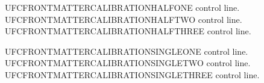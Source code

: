 \documentclass{abntexto-ufc}
\begin{document}
\pretextual

\clearpage
\thispagestyle{empty}
\noindent\hspace*{8cm}%
\begin{minipage}{\dimexpr\textwidth-8cm\relax}
  \onehalfsp
  \justifying
  \setlength{\parindent}{0pt}
  
\end{minipage}\par
\vfill
\clearpage


\clearpage
\thispagestyle{empty}

\begingroup
\onehalfsp
UFCFRONTMATTERCALIBRATIONHALFONE control line.\\
UFCFRONTMATTERCALIBRATIONHALFTWO control line.\\
UFCFRONTMATTERCALIBRATIONHALFTHREE control line.
\par
\endgroup

\vspace{3\baselineskip}

\begingroup
\fontsize{10}{12}\selectfont
\singlesp
UFCFRONTMATTERCALIBRATIONSINGLEONE control line.\\
UFCFRONTMATTERCALIBRATIONSINGLETWO control line.\\
UFCFRONTMATTERCALIBRATIONSINGLETHREE control line.
\par
\endgroup
\end{document}

